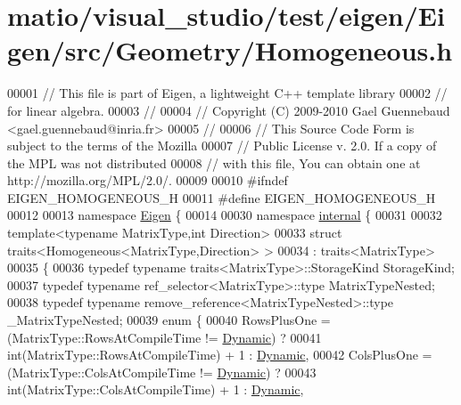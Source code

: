 \hypertarget{matio_2visual__studio_2test_2eigen_2_eigen_2src_2_geometry_2_homogeneous_8h_source}{}\section{matio/visual\+\_\+studio/test/eigen/\+Eigen/src/\+Geometry/\+Homogeneous.h}
\label{matio_2visual__studio_2test_2eigen_2_eigen_2src_2_geometry_2_homogeneous_8h_source}

\begin{DoxyCode}
00001 \textcolor{comment}{// This file is part of Eigen, a lightweight C++ template library}
00002 \textcolor{comment}{// for linear algebra.}
00003 \textcolor{comment}{//}
00004 \textcolor{comment}{// Copyright (C) 2009-2010 Gael Guennebaud <gael.guennebaud@inria.fr>}
00005 \textcolor{comment}{//}
00006 \textcolor{comment}{// This Source Code Form is subject to the terms of the Mozilla}
00007 \textcolor{comment}{// Public License v. 2.0. If a copy of the MPL was not distributed}
00008 \textcolor{comment}{// with this file, You can obtain one at http://mozilla.org/MPL/2.0/.}
00009 
00010 \textcolor{preprocessor}{#ifndef EIGEN\_HOMOGENEOUS\_H}
00011 \textcolor{preprocessor}{#define EIGEN\_HOMOGENEOUS\_H}
00012 
00013 \textcolor{keyword}{namespace }\hyperlink{namespace_eigen}{Eigen} \{ 
00014 
00030 \textcolor{keyword}{namespace }\hyperlink{namespaceinternal}{internal} \{
00031 
00032 \textcolor{keyword}{template}<\textcolor{keyword}{typename} MatrixType,\textcolor{keywordtype}{int} Direction>
00033 \textcolor{keyword}{struct }traits<Homogeneous<MatrixType,Direction> >
00034  : traits<MatrixType>
00035 \{
00036   \textcolor{keyword}{typedef} \textcolor{keyword}{typename} traits<MatrixType>::StorageKind StorageKind;
00037   \textcolor{keyword}{typedef} \textcolor{keyword}{typename} ref\_selector<MatrixType>::type MatrixTypeNested;
00038   \textcolor{keyword}{typedef} \textcolor{keyword}{typename} remove\_reference<MatrixTypeNested>::type \_MatrixTypeNested;
00039   \textcolor{keyword}{enum} \{
00040     RowsPlusOne = (MatrixType::RowsAtCompileTime != \hyperlink{namespace_eigen_ad81fa7195215a0ce30017dfac309f0b2}{Dynamic}) ?
00041                   \textcolor{keywordtype}{int}(MatrixType::RowsAtCompileTime) + 1 : \hyperlink{namespace_eigen_ad81fa7195215a0ce30017dfac309f0b2}{Dynamic},
00042     ColsPlusOne = (MatrixType::ColsAtCompileTime != \hyperlink{namespace_eigen_ad81fa7195215a0ce30017dfac309f0b2}{Dynamic}) ?
00043                   \textcolor{keywordtype}{int}(MatrixType::ColsAtCompileTime) + 1 : \hyperlink{namespace_eigen_ad81fa7195215a0ce30017dfac309f0b2}{Dynamic},

\end{DoxyCode}
